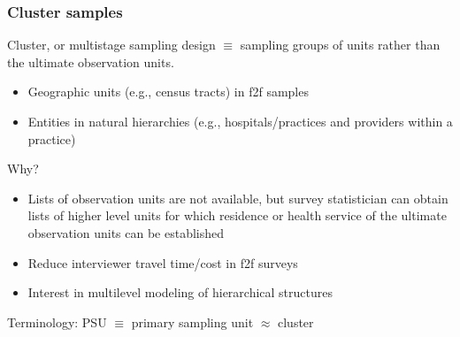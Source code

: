 \documentclass[aspectratio=43]{beamer}
\begin{document}
\begin{frame}\frametitle{Cluster samples}

Cluster, or multistage sampling design $\equiv$ sampling groups of units rather than the ultimate observation units.
\begin{itemize}
    \item Geographic units (e.g., census tracts) in f2f samples
    \item Entities in natural hierarchies (e.g., hospitals/practices and providers within a practice)
\end{itemize}

Why?

\begin{itemize}
    \item Lists of observation units are not available, but survey statistician
        can obtain lists of higher level units
        for which residence or health service of the ultimate observation units
        can be established
    \item Reduce interviewer travel time/cost in f2f surveys
    \item Interest in multilevel modeling of hierarchical structures
\end{itemize}

Terminology: PSU $\equiv$ primary sampling unit $\approx$ cluster

\end{frame}
\end{document}
